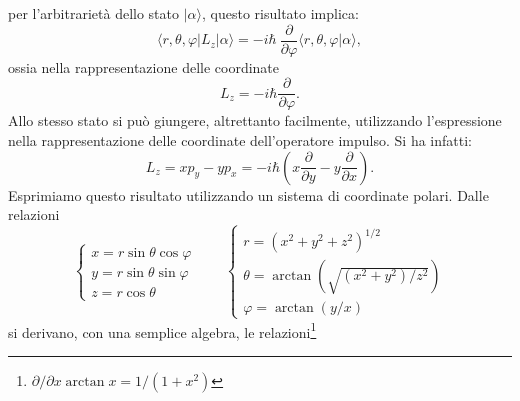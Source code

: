 \documentclass[a4paper,12pt,oneside]{book}
\begin{document}
per l'arbitrarietà dello stato $\vert \alpha \rangle$, questo risultato implica:
\begin{equation}
\langle r, \theta, \varphi \vert  L_z \vert \alpha\rangle =- i\hbar\ \frac{\partial}{\partial \varphi}\langle r, \theta, \varphi \vert\alpha\rangle ,
\end{equation}
ossia nella rappresentazione delle coordinate
\begin{equation}
L_z = -i\hbar \frac{\partial}{\partial \varphi}.
\label{eq:cap17_4}
\end{equation}
Allo stesso stato si può giungere, altrettanto facilmente, utilizzando l'espressione nella rappresentazione delle coordinate  dell'operatore impulso. Si ha infatti:
\begin{equation}
L_z= xp_y-yp_x = -i\hbar \left( x\frac{\partial}{\partial y} -y\frac{\partial}{\partial x}\right) .
\label{eq:cap17_3}
\end{equation}
Esprimiamo questo risultato utilizzando un sistema di coordinate polari. Dalle relazioni
\begin{equation}
\begin{cases}
x=r\sin \theta \cos \varphi \\
y=r\sin \theta \sin \varphi \\
z= r\cos\theta
\end{cases}
\qquad
\begin{cases}
r=(x^2+y^2+z^2)^{1/2} \\
\theta=\arctan\left(\sqrt{(x^2+y^2)/z^2}\right) \\
\varphi= \arctan \left(y/x\right)
\end{cases}
\end{equation}
si derivano, con una semplice algebra, le relazioni\footnote{$\partial/\partial x \arctan x = 1/(1+x^2)$}
\end{document}
